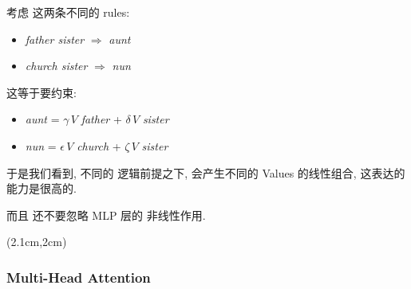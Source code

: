 \begin{preview}
\begin{minipage}{\textwidth}
考虑 这两条不同的 rules:
\begin{itemize}
	\item \textit{father sister} $\Rightarrow$ \textit{aunt}
	\item \textit{church sister} $\Rightarrow$ \textit{nun}
\end{itemize}
这等于要约束:
\begin{itemize}
	\item \textit{aunt} = $\gamma \, V$ \textit{father} + $\delta \, V$ \textit{sister}
	\item \textit{nun} = $\epsilon \, V$ \textit{church} + $\zeta \, V$ \textit{sister}
\end{itemize}
于是我们看到, 不同的 逻辑前提之下, 会产生不同的 Values 的线性组合, 这表达的能力是很高的.

而且 还不要忽略 MLP 层的 非线性作用.

\end{minipage}
\end{preview}

\begin{preview}
\begin{minipage}{\textwidth}

\setlength{\parskip}{0.4\baselineskip}
\begin{textblock*}{20cm}(2.1cm,2cm) %
	{}
	\hspace{8cm}
\end{textblock*}

\vspace*{0.3cm} 

\subsubsection{Multi-Head Attention}

\end{minipage}
\end{preview}

